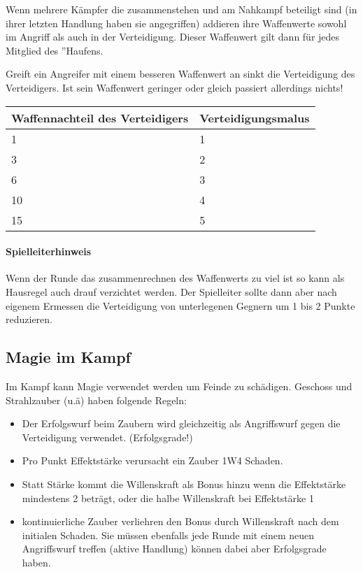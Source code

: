 \documentclass{article}
\begin{document}
Wenn mehrere Kämpfer die zusammenstehen und am Nahkampf beteiligt sind (in ihrer letzten Handlung haben sie
angegriffen) addieren ihre Waffenwerte sowohl im Angriff als auch in der Verteidigung. Dieser Waffenwert gilt dann
für jedes Mitglied des ''Haufens.

Greift ein Angreifer mit einem besseren Waffenwert an sinkt die Verteidigung des Verteidigers. Ist sein Waffenwert
geringer oder gleich passiert allerdings nichts!


\begin{small}
\begin{tabular}{|m{3cm}|m{3cm}|}
\hline
\textbf{Waffennachteil des Verteidigers}&\textbf{Verteidigungsmalus}\\
\hline
\hline
1&1\\
\hline
3&2\\
\hline
6&3\\
\hline
10&4\\
\hline
15&5\\
\hline
\end{tabular}
\end{small}

\begin{mdframed}[hidealllines=true, backgroundcolor=black!10]
\paragraph{Spielleiterhinweis}

Wenn der Runde das zusammenrechnen des Waffenwerts zu viel ist so kann als Hausregel auch drauf verzichtet werden.
Der Spielleiter sollte dann aber nach eigenem Ermessen die Verteidigung von unterlegenen Gegnern um 1 bis 2 Punkte
reduzieren.

\end{mdframed}
\begin{center}
\subsection{Magie im Kampf}
\end{center}

Im Kampf kann Magie verwendet werden um Feinde zu schädigen. Geschoss und Strahlzauber (u.ä) haben folgende Regeln:

\begin{itemize}
\item Der Erfolgswurf beim Zaubern wird gleichzeitig als Angriffswurf gegen die Verteidigung verwendet. (Erfolgsgrade!)
\item Pro Punkt Effektstärke verursacht ein Zauber 1W4 Schaden.
\item Statt Stärke kommt die Willenskraft als Bonus hinzu wenn die Effektstärke mindestens 2 beträgt, oder die halbe Willenskraft bei Effektstärke 1
\item kontinuierliche Zauber verliehren den Bonus durch Willenskraft nach dem initialen Schaden. Sie müssen ebenfalls jede Runde mit einem neuen Angriffswurf treffen (aktive Handlung) können dabei aber Erfolgsgrade haben.
\end{itemize}
\end{document}

